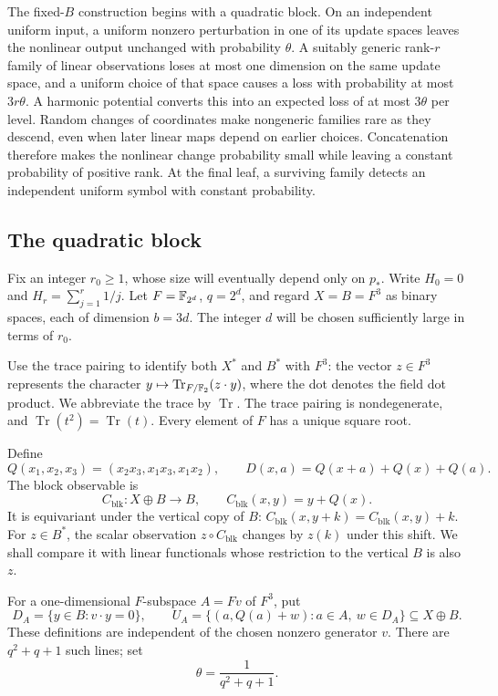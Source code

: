 The fixed-$B$ construction begins with a quadratic block.  On an independent
uniform input, a uniform nonzero perturbation in one of its update spaces
leaves the nonlinear output unchanged with probability $\theta$.  A
suitably generic rank-$r$ family of linear observations loses at most one
dimension on the same update space, and a uniform choice of that space
causes a loss with
probability at most $3r\theta$.  A harmonic potential converts this into an
expected loss of at most $3\theta$ per level.  Random changes of coordinates
make nongeneric families rare as they descend, even when later linear maps
depend on earlier choices.
Concatenation therefore makes the nonlinear change probability small while
leaving a constant probability of positive rank.  At the final leaf, a
surviving family detects an independent uniform symbol with constant
probability.

\subsection{The quadratic block}

Fix an integer $r_0\ge1$, whose size will eventually depend only on $p_*$.
Write $H_0=0$ and $H_r=\sum_{j=1}^r 1/j$.  Let
$F=\mathbb F_{2^d}$, $q=2^d$, and regard $X=B=F^3$ as binary spaces, each of
dimension $b=3d$.  The integer $d$ will be chosen sufficiently large in terms
of $r_0$.

Use the trace pairing to identify both $X^*$ and $B^*$ with $F^3$:
the vector $z\in F^3$ represents the character
$y\mapsto\operatorname{Tr}_{F/\mathbb F_2}(z\cdot y)$, where the dot denotes the
field dot product.  We abbreviate the trace by $\operatorname{Tr}$.
The trace pairing is nondegenerate, and
$\operatorname{Tr}(t^2)=\operatorname{Tr}(t)$.  Every element of $F$ has a
unique square root.

Define
\begin{equation}\label{eq:latent-quadratic}
 Q(x_1,x_2,x_3)=(x_2x_3,x_1x_3,x_1x_2),
 \qquad
 D(x,a)=Q(x+a)+Q(x)+Q(a).
\end{equation}
The block observable is
\[
 C_{\mathrm{blk}}:X\oplus B\longrightarrow B,
 \qquad C_{\mathrm{blk}}(x,y)=y+Q(x).
\]
It is equivariant under the vertical copy of $B$:
$C_{\mathrm{blk}}(x,y+k)=C_{\mathrm{blk}}(x,y)+k$.
For $z\in B^*$, the scalar observation $z\circ C_{\mathrm{blk}}$ changes
by $z(k)$ under this shift.  We shall compare it with linear functionals
whose restriction to the vertical $B$ is also $z$.

For a one-dimensional $F$-subspace $A=Fv$ of $F^3$, put
\begin{equation}\label{eq:latent-block-subspaces}
 D_A=\{y\in B:v\cdot y=0\},
 \qquad
 U_A=\{(a,Q(a)+w):a\in A,\ w\in D_A\}\subseteq X\oplus B.
\end{equation}
These definitions are independent of the chosen nonzero generator $v$.
There are $q^2+q+1$ such lines; set
\begin{equation}\label{eq:latent-theta}
 \theta=\frac{1}{q^2+q+1}.
\end{equation}

